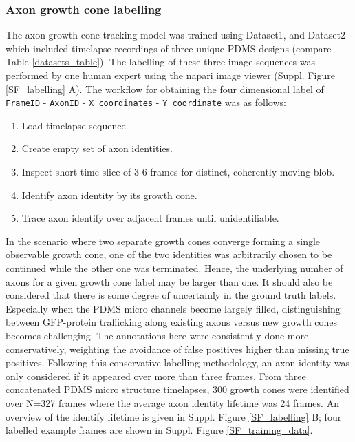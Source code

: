 \subsubsection{Axon growth cone labelling}
The axon growth cone tracking model was trained using Dataset1, and Dataset2
which included timelapse recordings of three unique PDMS designs (compare Table
\ref{datasets_table}). The labelling of these three image sequences was
performed by one human expert using the napari image viewer (Suppl. Figure
\ref{SF_labelling} A). The workflow for obtaining the four dimensional label of
\verb|FrameID| - \verb|AxonID| - \verb|X coordinates| - \verb|Y coordinate| was
as follows:
\vspace{2mm}
\begin{enumerate}
    \item Load timelapse sequence.
    \item Create empty set of axon identities.
    \item Inspect short time slice of 3-6 frames for distinct, coherently moving
    blob.
    \item Identify axon identity by its growth cone.
    \item Trace axon identify over adjacent frames until unidentifiable.
\end{enumerate}
\vspace{2mm}
In the scenario where two separate growth cones converge forming a single
observable growth cone, one of the two identities was arbitrarily chosen to be
continued while the other one was terminated. Hence, the underlying number of
axons for a given growth cone label may be larger than one. It should also be
considered that there is some degree of uncertainly in the ground truth labels.
Especially when the PDMS micro channels become largely filled, distinguishing
between GFP-protein trafficking along existing axons versus new growth cones
becomes challenging. The annotations here were consistently done more
conservatively, weighting the avoidance of false positives higher than missing
true positives. Following this conservative labelling methodology, an axon
identity was only considered if it appeared over more than three frames. From
three concatenated PDMS micro structure timelapses, 300 growth cones were
identified over N=327 frames where the average axon identity lifetime was 24
frames. An overview of the identify lifetime is given in Suppl. Figure
\ref{SF_labelling} B; four labelled example frames are shown in Suppl. Figure
\ref{SF_training_data}.

